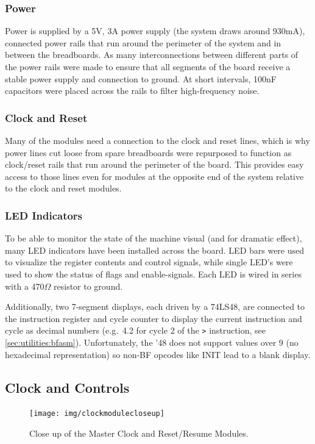 \subsubsection{Power}
Power is supplied by a 5V, 3A power supply (the system draws around 930mA), connected power rails that run around the perimeter of the system and in between the breadboards. As many interconnections between different parts of the power rails were made to ensure that all segments of the board receive a stable power supply and connection to ground. At short intervals, 100nF capacitors were placed across the rails to filter high-frequency noise.

\subsubsection{Clock and Reset}
Many of the modules need a connection to the clock and reset lines, which is why power lines cut loose from spare breadboards were repurposed to function as clock/reset rails that run around the perimeter of the board. This provides easy access to those lines even for modules at the opposite end of the system relative to the clock and reset modules.

\subsubsection{LED Indicators}
To be able to monitor the state of the machine visual (and for dramatic effect), many LED indicators have been installed across the board. LED bars were used to visualize the register contents and control signals, while single LED's were used to show the status of flags and enable-signals. Each LED is wired in series with a 470$\Omega$ resistor to ground.

Additionally, two 7-segment displays, each driven by a 74LS48, are connected to the instruction register and cycle counter to display the current instruction and cycle as decimal numbers (e.g.~4.2 for cycle 2 of the \texttt{>} instruction, see \ref{sec:utilities:bfasm}). Unfortunately, the '48 does not support values over 9 (no hexadecimal representation) so non-BF opcodes like INIT lead to a blank display. 



\newpage\subsection{Clock and Controls} \label{sec:clock}
\begin{figure}[H]
  \centering
  \texttt{[image: img/clockmodulecloseup]}
  \caption{Close up of the Master Clock and Reset/Resume Modules.}
  \label{fig:masterclockcloseup}
\end{figure}


